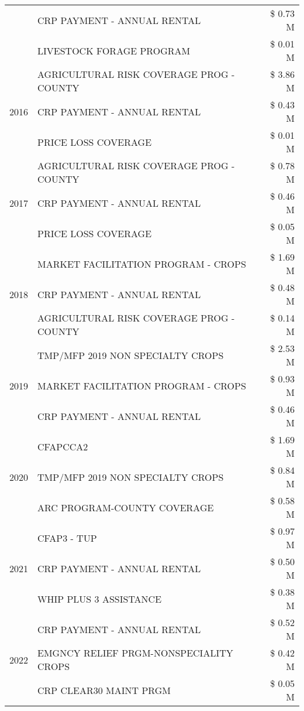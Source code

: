 \begin{tabular}{llr}
 & CRP PAYMENT - ANNUAL RENTAL & \$ 0.73 M \\
 & LIVESTOCK FORAGE PROGRAM & \$ 0.01 M \\
\cline{1-3}
\multirow[t]{3}{*}{2016} & AGRICULTURAL RISK COVERAGE PROG - COUNTY & \$ 3.86 M \\
 & CRP PAYMENT - ANNUAL RENTAL & \$ 0.43 M \\
 & PRICE LOSS COVERAGE & \$ 0.01 M \\
\cline{1-3}
\multirow[t]{3}{*}{2017} & AGRICULTURAL RISK COVERAGE PROG - COUNTY & \$ 0.78 M \\
 & CRP PAYMENT - ANNUAL RENTAL & \$ 0.46 M \\
 & PRICE LOSS COVERAGE & \$ 0.05 M \\
\cline{1-3}
\multirow[t]{3}{*}{2018} & MARKET FACILITATION PROGRAM - CROPS & \$ 1.69 M \\
 & CRP PAYMENT - ANNUAL RENTAL & \$ 0.48 M \\
 & AGRICULTURAL RISK COVERAGE PROG - COUNTY & \$ 0.14 M \\
\cline{1-3}
\multirow[t]{3}{*}{2019} & TMP/MFP 2019 NON SPECIALTY CROPS & \$ 2.53 M \\
 & MARKET FACILITATION PROGRAM - CROPS & \$ 0.93 M \\
 & CRP PAYMENT - ANNUAL RENTAL & \$ 0.46 M \\
\cline{1-3}
\multirow[t]{3}{*}{2020} & CFAPCCA2 & \$ 1.69 M \\
 & TMP/MFP 2019 NON SPECIALTY CROPS & \$ 0.84 M \\
 & ARC PROGRAM-COUNTY COVERAGE & \$ 0.58 M \\
\cline{1-3}
\multirow[t]{3}{*}{2021} & CFAP3 - TUP & \$ 0.97 M \\
 & CRP PAYMENT - ANNUAL RENTAL & \$ 0.50 M \\
 & WHIP PLUS 3 ASSISTANCE & \$ 0.38 M \\
\cline{1-3}
\multirow[t]{3}{*}{2022} & CRP PAYMENT - ANNUAL RENTAL & \$ 0.52 M \\
 & EMGNCY RELIEF PRGM-NONSPECIALITY CROPS & \$ 0.42 M \\
 & CRP CLEAR30 MAINT PRGM & \$ 0.05 M \\
\cline{1-3}
\bottomrule
\end{tabular}
